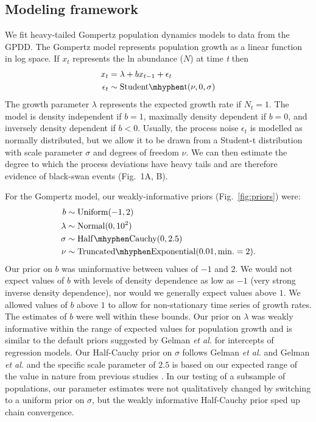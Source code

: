 \subsection{Modeling framework}

We fit heavy-tailed Gompertz population dynamics models to data from the GPDD. The Gompertz model represents population growth as a linear function in log space. If \(x_{t}\) represents the ln abundance (\(N\)) at time \emph{t} then
\begin{align}
x_t &= \lambda + bx_{t - 1} + \epsilon_t\\
\epsilon_t &\sim \mathrm{Student\mhyphen t}(\nu, 0, \sigma)
\end{align}
The growth parameter \(\lambda\) represents the expected growth rate if \(N_{t}
= 1\). The model is density independent if \(b = 1\), maximally density
dependent if \(b = 0\), and inversely density dependent if \(b < 0\). Usually,
the process noise \(\epsilon_{t}\) is modelled as normally distributed, but we
allow it to be drawn from a Student-t distribution with scale parameter
\(\sigma\) and degrees of freedom \(\nu\). We can then estimate the degree to
which the process deviations have heavy tails and are therefore evidence of
black-swan events (Fig.~1A, B).

For the Gompertz model, our weakly-informative priors (Fig.~\ref{fig:priors}) were:
\begin{align}
b &\sim \mathrm{Uniform}(-1, 2)\\ \lambda &\sim \mathrm{Normal}(0, 10^2)\\
\sigma &\sim \mathrm{Half\mhyphen Cauchy} (0, 2.5)\\ \nu &\sim
\mathrm{Truncated\mhyphen Exponential}(0.01, \mathrm{min.} = 2).
\end{align}
Our prior on \(b\) was uninformative between values of \(-1\) and \(2\). We
would not expect values of \(b\) with levels of density dependence as low as
\(-1\) (very strong inverse density dependence), nor would we generally expect
values above \(1\). We allowed values of \(b\) above \(1\) to allow for
non-stationary time series of growth rates. The estimates of \(b\) were well
within these bounds. Our prior on \(\lambda\) was weakly informative within the
range of expected values for population growth and is similar to the default
priors suggested by Gelman \emph{et al.} \citep{gelman2008d} for intercepts of
regression models. Our Half-Cauchy prior on \(\sigma\) follows Gelman \emph{et
al.} \citep{gelman2006c} and Gelman \emph{et al.} \citep{gelman2008d} and the
specific scale parameter of \(2.5\) is based on our expected range of the value
in nature from previous studies \citep{connors2014}. In our testing of a
subsample of populations, our parameter estimates were not qualitatively
changed by switching to a uniform prior on \(\sigma\), but the weakly
informative Half-Cauchy prior sped up chain convergence.

